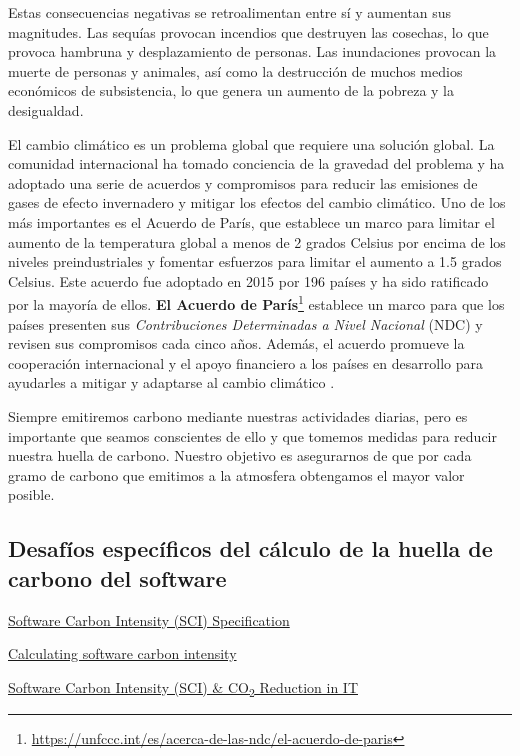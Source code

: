 \documentclass[12pt,a4paper]{report}
\begin{document}
Estas consecuencias negativas se retroalimentan entre sí y aumentan sus
magnitudes. Las sequías provocan incendios que destruyen las cosechas, lo que
provoca hambruna y desplazamiento de personas. Las inundaciones provocan la
muerte de personas y animales, así como la destrucción de muchos medios
económicos de subsistencia, lo que genera un aumento de la pobreza y la
desigualdad.

El cambio climático es un problema global que requiere una solución global. La
comunidad internacional ha tomado conciencia de la gravedad del problema y ha
adoptado una serie de acuerdos y compromisos para reducir las emisiones de
gases de efecto invernadero y mitigar los efectos del cambio climático. Uno de
los más importantes es el Acuerdo de París, que establece un marco para limitar
el aumento de la temperatura global a menos de 2 grados Celsius por encima de
los niveles preindustriales y fomentar esfuerzos para limitar el aumento a 1.5
grados Celsius. Este acuerdo fue adoptado en 2015 por 196 países y ha sido
ratificado por la mayoría de ellos. \textbf{El Acuerdo de París}\footnote{\href{https://unfccc.int/es/acerca-de-las-ndc/el-acuerdo-de-paris}{https://unfccc.int/es/acerca-de-las-ndc/el-acuerdo-de-paris}} establece un marco para
que los países presenten sus \textit{Contribuciones Determinadas a Nivel Nacional} (NDC)
y revisen sus compromisos cada cinco años. Además, el acuerdo promueve la
cooperación internacional y el apoyo financiero a los países en desarrollo para
ayudarles a mitigar y adaptarse al cambio climático \cite{ref4}. 

Siempre emitiremos carbono mediante nuestras actividades diarias, pero es
importante que seamos conscientes de ello y que tomemos medidas para reducir
nuestra huella de carbono. Nuestro objetivo es asegurarnos de que por cada
gramo de carbono que emitimos a la atmosfera obtengamos el mayor valor posible.

\subsection{Desafíos específicos del cálculo de la huella de carbono del software}

\href{https://sci.greensoftware.foundation/}{Software Carbon Intensity (SCI) Specification}

\href{https://www.thoughtworks.com/insights/blog/ethical-tech/calculating-software-carbon-intensity}{Calculating software carbon intensity}

\href{https://tecnovy.com/en/software-carbon-intensity}{Software Carbon Intensity (SCI) \& CO\textsubscript{2} Reduction in IT}
\end{document}
